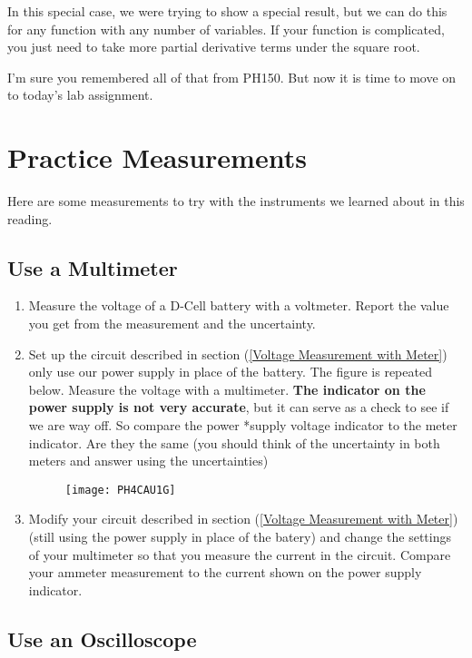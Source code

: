 In this special case, we were trying to show a special result, but we can do this for any function with any number of variables. If your function is complicated, you just need to take more partial derivative terms under the square root.

I'm sure you remembered all of that from PH150. But now it is time to move on to today's lab assignment.
\vfill
\pagebreak
\section{Practice Measurements}
Here are some measurements to try with the instruments we learned about in this reading.

\subsection{Use a Multimeter}

\begin{enumerate}
\item Measure the voltage of a D-Cell battery with a voltmeter. Report the value you get from the measurement and the uncertainty.

\item Set up the circuit described in section (\ref{Voltage Measurement with Meter}) only use our power supply in place of the battery. The figure is repeated below. Measure the voltage with a multimeter. \textbf{The indicator on the power supply is not very accurate}, but it can serve as a check to see if we are way off. So compare the power *supply voltage indicator to the meter indicator. Are they the same (you should think of the uncertainty in both meters and answer using the uncertainties)

\begin{figure}[h!]
	\centering
    \texttt{[image: PH4CAU1G]}  
\end{figure}

\item Modify your circuit described in section (\ref{Voltage Measurement with Meter}) (still using the power supply in place of the batery) and change the settings of your multimeter so that you measure the current in the circuit. Compare your ammeter measurement to the current shown on the power supply indicator.

\end{enumerate}

\subsection{Use an Oscilloscope}

